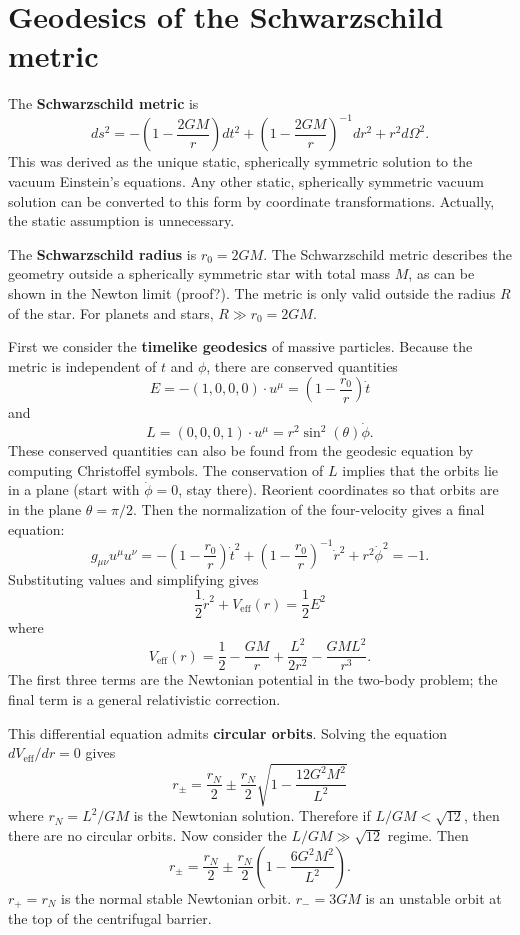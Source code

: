 \documentclass[11pt]{article}
\begin{document}
\section{Geodesics of the Schwarzschild metric}

The \textbf{Schwarzschild metric} is
$$ ds^2 = - \left( 1 - \frac{2GM}{r} \right) dt^2 + \left( 1 - \frac{2GM}{r} \right)^{-1} dr^2 + r^2 d\Omega^2. $$
This was derived as the unique static, spherically symmetric solution to the vacuum Einstein's equations.
Any other static, spherically symmetric vacuum solution can be converted to this form by coordinate transformations.
Actually, the static assumption is unnecessary.

The \textbf{Schwarzschild radius} is $r_0 = 2GM$.
The Schwarzschild metric describes the geometry outside a spherically symmetric star with total mass $M$, as can be shown in the Newton limit (proof?).
The metric is only valid outside the radius $R$ of the star.
For planets and stars, $R \gg r_0 = 2GM$.

First we consider the \textbf{timelike geodesics} of massive particles.
Because the metric is independent of $t$ and $\phi$, there are conserved quantities 
$$ E = - (1, 0, 0, 0) \cdot u^\mu = \left( 1 - \frac{r_0}{r} \right) \dot{t} $$
and
$$ L = (0, 0, 0, 1) \cdot u^\mu = r^2 \sin^2 ( \theta ) \dot{\phi}. $$
These conserved quantities can also be found from the geodesic equation by computing Christoffel symbols.
The conservation of $L$ implies that the orbits lie in a plane (start with $\dot{\phi} = 0$, stay there).
Reorient coordinates so that orbits are in the plane $\theta = \pi/2$.
Then the normalization of the four-velocity gives a final equation:
$$ g_{\mu \nu} u^\mu u^\nu = - \left( 1 - \frac{r_0}{r} \right) \dot{t}^2 + \left( 1 - \frac{r_0}{r} \right)^{-1} \dot{r}^2 + r^2 \dot{\phi}^2 = -1.  $$
Substituting values and simplifying gives
$$ \frac{1}{2} \dot{r}^2 + V_{\textrm{eff}}(r) = \frac{1}{2} E^2 $$
where
$$ V_{\textrm{eff}}(r) = \frac{1}{2} - \frac{G M}{r} + \frac{L^2}{2r^2} - \frac{GML^2}{r^3}. $$
The first three terms are the Newtonian potential in the two-body problem; the final term is a general relativistic correction.

This differential equation admits \textbf{circular orbits}.
Solving the equation $dV_{\textrm{eff}}/dr = 0$ gives
$$ r_\pm = \frac{r_N}{2} \pm \frac{r_N}{2} \sqrt{1 - \frac{12 G^2 M^2}{L^2}} $$
where $r_N = L^2/GM$ is the Newtonian solution.
Therefore if $L/GM < \sqrt{12}$, then there are no circular orbits.
Now consider the $L/GM \gg \sqrt{12}$ regime.
Then
$$ r_\pm =  \frac{r_N}{2} \pm \frac{r_N}{2} \left( 1 - \frac{6 G^2 M^2}{L^2} \right). $$ 
$r_+ = r_N$ is the normal stable Newtonian orbit.
$r_- = 3GM$ is an unstable orbit at the top of the centrifugal barrier.
\end{document}
